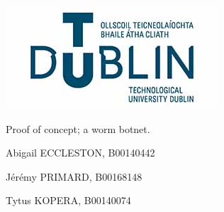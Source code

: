 \documentclass[../main.tex]{subfiles}
\begin{document}
\makeatletter
\begin{titlepage}
    
	\normalfont

	\begin{center}

		\uppercase{
			\fontsize{12}{12} 
			\selectfont
		}

		\includegraphics[height=0.25\textwidth]{tu_dublin_logo.jpg}

	\end{center}








	\vfill

	\begin{center}
		\fontsize{16.5}{18} 
		\selectfont
		\bf

		Proof of concept; a worm botnet.

		\vfill


	
	\end{center}




	\begin{center}
		\bf
		\fontsize{12}{12} 
		\selectfont


		\fontsize{14}{18} 
		\selectfont

        Abigail ECCLESTON, B00140442

        Jérémy PRIMARD, B00168148
        
        Tytus KOPERA, B00140074

		\vfill

		\fontsize{12}{12} 
		\selectfont


\end{center}
\end{titlepage}
\end{document}
